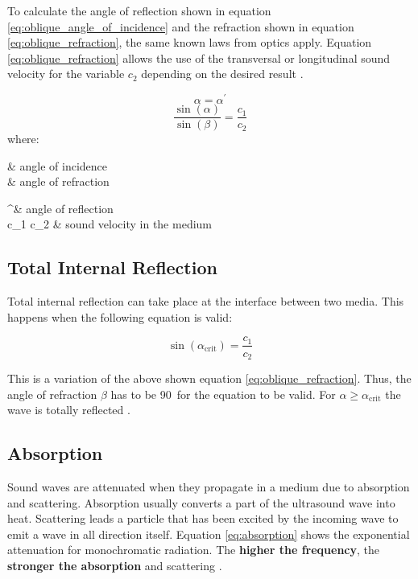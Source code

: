 To calculate the angle of reflection shown in equation \ref{eq:oblique_angle_of_incidence} and the refraction shown in equation \ref{eq:oblique_refraction}, the same known laws from optics apply. Equation \ref{eq:oblique_refraction} allows the use of the transversal or longitudinal sound velocity for the variable $c_2$ depending on the desired result \cite{ultrasound}.

\begin{equation}
\alpha = \alpha^\prime
\label{eq:oblique_angle_of_incidence}
\end{equation}
\begin{equation}
\dfrac{\sin{(\alpha)}}{\sin{(\beta)}} = \dfrac{c_1}{c_2}
\label{eq:oblique_refraction}
\end{equation}
where:
\begin{multicols}{2}
\begin{conditions}
	\alpha & angle of incidence \\
	\beta & angle of refraction
\end{conditions}
\begin{conditions}
	\alpha^\prime & angle of reflection \\
	c_1 \text{, } c_2 & sound velocity in the medium
\end{conditions}
\end{multicols}


\subsection{Total Internal Reflection}
\label{subsec:Total_Internal_Reflection}
Total internal reflection can take place at the interface between two media. This happens when the following equation is valid:

\[
\sin{(\alpha_\text{crit})} = \dfrac{c_1}{c_2}
\]

This is a variation of the above shown equation \ref{eq:oblique_refraction}. Thus, the angle of refraction $\beta$ has to be 90\textdegree\ for the equation to be valid. For $\alpha \geq \alpha_\text{crit}$ the wave is totally reflected \cite{ultrasound}.

\subsection{Absorption}
\label{subsec:Absorption}
Sound waves are attenuated when they propagate in a medium due to absorption and scattering. Absorption usually converts a part of the ultrasound wave into heat. Scattering leads a particle that has been excited by the incoming wave to emit a wave in all direction itself. Equation \ref{eq:absorption} shows the exponential attenuation for monochromatic radiation. The \textbf{higher the frequency}, the \textbf{stronger the absorption} and scattering \cite{ultrasound}.

